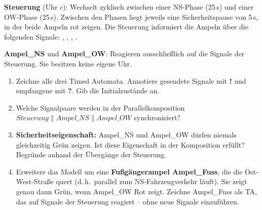 \textbf{Steuerung} (Uhr $c$): Wechselt zyklisch zwischen einer NS-Phase (25\,s) und einer
OW-Phase (25\,s). Zwischen den Phasen liegt jeweils eine Sicherheitspause von 5\,s, in der
beide Ampeln rot zeigen. Die Steuerung informiert die Ampeln über die folgenden Signale:
, , , .

\textbf{Ampel\_NS} und \textbf{Ampel\_OW}: Reagieren ausschließlich auf die Signale der
Steuerung. Sie besitzen keine eigene Uhr.

\begin{enumerate}
  \item Zeichne alle drei Timed Automata. Annotiere gesendete Signale mit \textbf{!}
        und empfangene mit \textbf{?}. Gib die Initialzustände an.
  \item Welche Signalpaare werden in der Parallelkomposition
        $\mathit{Steuerung} \| \mathit{Ampel\_NS} \| \mathit{Ampel\_OW}$ synchronisiert?
  \item \textbf{Sicherheitseigenschaft:} Ampel\_NS und Ampel\_OW dürfen niemals gleichzeitig
        Grün zeigen. Ist diese Eigenschaft in der Komposition erfüllt? Begründe anhand der
        Übergänge der Steuerung.
  \item Erweitere das Modell um eine \textbf{Fußgängerampel Ampel\_Fuss}, die die
        Ost-West-Straße quert (d.\,h.\ parallel zum NS-Fahrzeugverkehr läuft). Sie zeigt
        genau dann Grün, wenn Ampel\_OW Rot zeigt. Zeichne Ampel\_Fuss als TA, das auf
        Signale der Steuerung reagiert -- ohne neue Signale einzuführen.
\end{enumerate}

